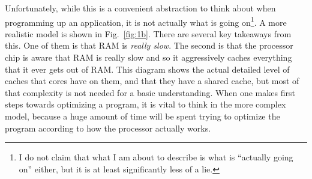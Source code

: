 Unfortunately, while this is a convenient abstraction to think about when programming up an application, it
is not actually what is going on\footnote{I do not claim that what I am about to describe is what is ``actually going on'' either,
but it is at least significantly less of a lie.}. A more realistic model is shown in Fig.~\ref{fig:1b}. There are
several key takeaways from this. One of them is that RAM is \textit{really slow}. The second is that the processor
chip is aware that RAM is really slow and so it aggressively caches everything that it ever gets out of RAM. This diagram
shows the actual detailed level of caches that cores have on them, and that they have a shared cache, but most of that
complexity is not needed for a basic understanding. When one makes first steps towards optimizing a program, it is vital
to think in the more complex model, because a huge amount of time will be spent trying to optimize the program according
to how the processor actually works.

